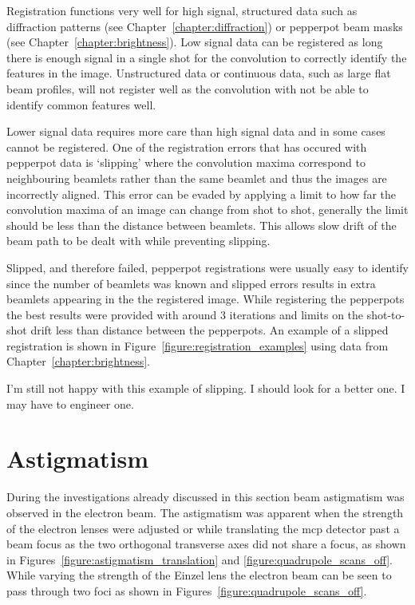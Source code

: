 Registration functions very well for high signal, structured data such as diffraction patterns (see Chapter~\ref{chapter:diffraction}) or pepperpot beam masks (see Chapter~\ref{chapter:brightness}).
Low signal data can be registered as long there is enough signal in a single shot for the convolution to correctly identify the features in the image.
Unstructured data or continuous data, such as large flat beam profiles, will not register well as the convolution with not be able to identify common features well.

Lower signal data requires more care than high signal data and in some cases cannot be registered.
One of the registration errors that has occured with pepperpot data is `slipping' where the convolution maxima correspond to neighbouring beamlets rather than the same beamlet and thus the images are incorrectly aligned.
This error can be evaded by applying a limit to how far the convolution maxima of an image can change from shot to shot, generally the limit should be less than the distance between beamlets.
This allows slow drift of the beam path to be dealt with while preventing slipping.

Slipped, and therefore failed, pepperpot registrations were usually easy to identify since the number of beamlets was known and slipped errors results in extra beamlets appearing in the the registered image.
While registering the pepperpots the best results were provided with around 3 iterations and limits on the shot-to-shot drift less than distance between the pepperpots.
An example of a slipped registration is shown in Figure~\ref{figure:registration_examples} using data from Chapter~\ref{chapter:brightness}.

{\color{red} I'm still not happy with this example of slipping. I should look for a better one. I may have to engineer one.}

\section{Astigmatism}\label{section:quadrupole}

During the investigations already discussed in this section beam astigmatism was observed in the electron beam.
The astigmatism was apparent when the strength of the electron lenses were adjusted or while translating the \gls{mcp} detector past a beam focus as the two orthogonal transverse axes did not share a focus, as shown in Figures~\ref{figure:astigmatism_translation} and \ref{figure:quadrupole_scans_off}.
While varying the strength of the Einzel lens the electron beam can be seen to pass through two foci as shown in Figures~\ref{figure:quadrupole_scans_off}.

